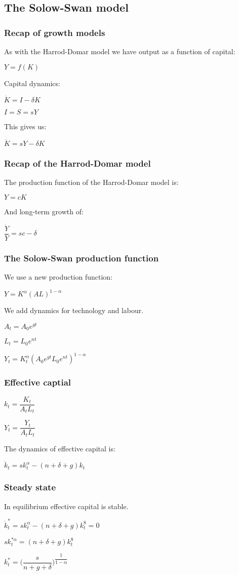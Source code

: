 
\subsection{The Solow-Swan model}

\subsubsection{Recap of growth models}

As with the Harrod-Domar model we have output as a function of capital:

\(Y=f(K)\)

Capital dynamics:

\(\dot K=I-\delta K\)

\(I=S=sY\)

This gives us:

\(\dot K = sY-\delta K\)

\subsubsection{Recap of the Harrod-Domar model}

The production function of the Harrod-Domar model is:

\(Y=cK\)

And long-term growth of:

\(\dfrac{\dot Y}{Y}=sc-\delta \)

\subsubsection{The Solow-Swan production function}

We use a new production function:

\(Y=K^\alpha (AL)^{1-\alpha }\)

We add dynamics for technology and labour.

\(A_t=A_0e^{gt}\)

\(L_t=L_0e^{nt}\)

\(Y_t=K_t^\alpha (A_0e^{gt}L_0e^{nt})^{1-\alpha }\)

\subsubsection{Effective captial}

\(k_t=\dfrac{K_t}{A_tL_t}\)

\(Y_t=\dfrac{Y_t}{A_tL_t}\)

The dynamics of effective capital is:

\(\dot k_t=sk_t^{\alpha }-(n+\delta +g)k_t\)

\subsubsection{Steady state}

In equilibrium effective capital is stable.

\(\dot k_t^*=sk_t^{\alpha }-(n+\delta +g)k_t^8=0\)

\(sk_t^{*\alpha }=(n+\delta +g)k_t^8\)

\(k_t^*=\biggr (\dfrac{s}{n+g+\delta }\biggr )^{\dfrac{1}{1-\alpha }}\)

